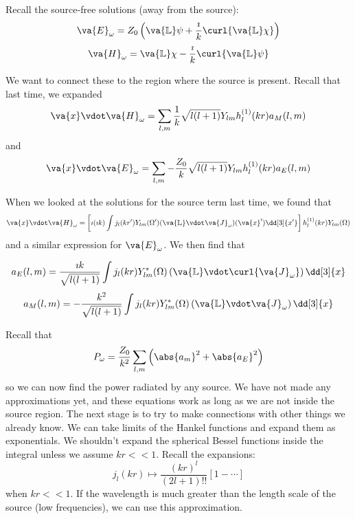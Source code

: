 \documentclass[a4paper,twoside,master.tex]{subfiles}
\begin{document}

Recall the source-free solutions (away from the source):
\begin{equation}
    \va{E}_{\omega} = Z_0 \left( \va{\mathbb{L}} \psi + \frac{\imath}{k} \curl{ \va{\mathbb{L}} \chi} \right)
\end{equation}
\begin{equation}
    \va{H}_{\omega} = \va{\mathbb{L}} \chi - \frac{\imath}{k} \curl{ \va{\mathbb{L}} \psi}
\end{equation}

We want to connect these to the region where the source is present. Recall that last time, we expanded
\begin{equation}
    \va{x} \vdot \va{H}_{\omega} = \sum_{l,m} \frac{1}{k} \sqrt{l(l+1)} Y_{lm} h_l^{(1)}(kr) a_M(l,m) 
\end{equation}
and
\begin{equation}
    \va{x} \vdot \va{E}_{\omega} = \sum_{l,m} - \frac{Z_0}{k} \sqrt{l(l+1)} Y_{lm} h_l^{(1)}(kr) a_E(l,m)
\end{equation}

When we looked at the solutions for the source term last time, we found that
\begin{equation}
    \va{x} \vdot \va{H}_{\omega} = \left[ \imath (\imath k) \int j_l(kr') Y_{lm}(\Omega') ( \va{\mathbb{L}} \vdot \va{J}_{\omega})( \va{x}') \dd[3]{x'} \right] h_l^{(1)}(kr) Y_{lm}(\Omega)
\end{equation}
and a similar expression for $ \va{E}_{\omega} $. We then find that

\begin{equation}
    a_E(l,m) = \frac{\imath k}{\sqrt{l(l+1)}} \int j_l(kr) Y_{lm}^*(\Omega) \left( \va{\mathbb{L}} \vdot \curl{ \va{J}_{\omega}} \right) \dd[3]{x}
\end{equation}
\begin{equation}
    a_M(l,m) = - \frac{k^2}{\sqrt{l(l+1)}} \int j_l(kr) Y_{lm}^*(\Omega) \left( \va{\mathbb{L}} \vdot \va{J}_{\omega} \right) \dd[3]{x}
\end{equation}

Recall that
\begin{equation}
    P_{\omega} = \frac{Z_0}{k^2} \sum_{l,m} \left( \abs{a_m}^2 + \abs{a_E}^2 \right)
\end{equation}
so we can now find the power radiated by any source. We have not made any approximations yet, and these equations work as long as we are not inside the source region. The next stage is to try to make connections with other things we already know. We can take limits of the Hankel functions and expand them as exponentials. We shouldn't expand the spherical Bessel functions inside the integral unless we assume $ kr << 1 $. Recall the expansions:
\begin{equation}
    j_l(kr) \mapsto \frac{(kr)^l}{(2l+1)!!} \left[ 1 - \cdots \right]
\end{equation}
when $ kr << 1 $. If the wavelength is much greater than the length scale of the source (low frequencies), we can use this approximation.
\end{document}
